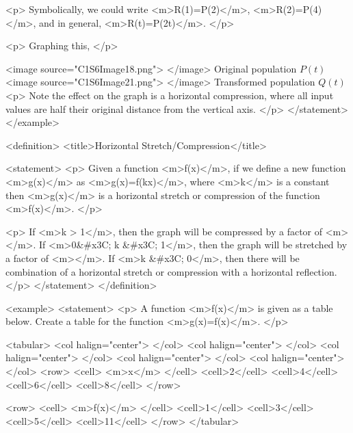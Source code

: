                 <p>
                    Symbolically, we could write <m>R(1)=P(2)</m>, <m>R(2)=P(4)</m>, and in general, <m>R(t)=P(2t)</m>.
                </p>

                <p>
                    Graphing this,
                </p>

                <image source="C1S6Image18.png">
                </image>
                Original population $P(t)$
                <image source="C1S6Image21.png">
                </image>
                Transformed population $Q(t)$
                <p>
                    Note the effect on the graph is a horizontal compression, where all input values are half their original distance from the vertical axis.
                </p>
            </statement>
        </example>

        <definition>
            <title>Horizontal Stretch/Compression</title>

            <statement>
                <p>
                    Given a function <m>f(x)</m>, if we define a new function <m>g(x)</m> as <m>g(x)=f(kx)</m>, where <m>k</m> is a constant then <m>g(x)</m> is a horizontal stretch or compression of the function <m>f(x)</m>.
                </p>

                <p>
                    If <m>k > 1</m>, then the graph will be compressed by a factor of <m></m>.
                    If <m>0&#x3C; k &#x3C; 1</m>, then the graph will be stretched by a factor of <m></m>.
                    If <m>k &#x3C; 0</m>, then there will be combination of a horizontal stretch or compression with a horizontal reflection.
                </p>
            </statement>
        </definition>

        <example>
            <statement>
                <p>
                    A function <m>f(x)</m> is given as a table below.
                    Create a table for the function <m>g(x)=f(x)</m>.
                </p>

                <tabular>
                    <col halign="center"> </col> <col halign="center"> </col> <col halign="center"> </col> <col halign="center"> </col> <col halign="center"> </col>
                    <row>
                        <cell> <m>x</m> </cell>
                        <cell>2</cell>
                        <cell>4</cell>
                        <cell>6</cell>
                        <cell>8</cell>
                    </row>

                    <row>
                        <cell> <m>f(x)</m> </cell>
                        <cell>1</cell>
                        <cell>3</cell>
                        <cell>5</cell>
                        <cell>11</cell>
                    </row>
                </tabular>

